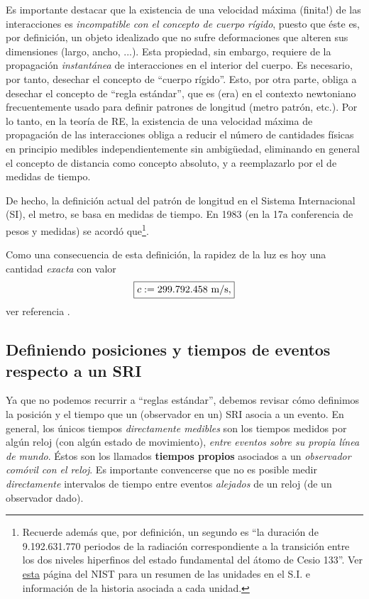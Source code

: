 Es importante destacar que la existencia de una velocidad máxima (finita!) de las interacciones es \textit{incompatible con el concepto de
cuerpo rígido}, puesto que éste es, por definición, un objeto idealizado
que no sufre deformaciones que alteren sus dimensiones (largo, ancho, ...).
Esta propiedad, sin embargo, requiere de la propagación \textit{instantánea} de interacciones en el interior del cuerpo. Es necesario, por tanto, desechar el concepto de ``cuerpo
rígido''. Esto, por otra parte, obliga a desechar el concepto de ``regla
estándar'', que es (era) en el contexto newtoniano frecuentemente usado para definir patrones de longitud (metro patrón, etc.). 
Por lo tanto, en la teoría de RE, la existencia de una velocidad máxima de propagación de las interacciones obliga a reducir el número de cantidades físicas en principio medibles independientemente sin ambig\"uedad, eliminando en general el concepto de distancia como concepto absoluto, y a reemplazarlo por el de medidas de tiempo.

De hecho, la definición actual del patrón de longitud en el Sistema
Internacional (SI), el metro, se basa en medidas de tiempo. En 1983 (en la 17a
conferencia de pesos y medidas) se acordó que\footnote{Recuerde además que, por definición, un segundo es ``la duración de 9.192.631.770 periodos de la radiación correspondiente a la transición entre los dos niveles hiperfinos del estado fundamental del átomo de Cesio 133''. Ver \href{http://physics.nist.gov/cuu/Units/current.html}{esta} página del NIST para un resumen de las unidades en el S.I. e información de la historia asociada a cada unidad.}.
\begin{quotation}
\end{quotation}
Como una consecuencia de esta definición, la rapidez de la luz es hoy una
cantidad \textit{exacta} con valor
\begin{equation}
\boxed{c:=299.792.458\rm\ m/s,}
\end{equation}
ver referencia \cite{CODATA00}.

\subsection{Definiendo posiciones y tiempos de eventos respecto a un SRI}

Ya que no podemos recurrir a ``reglas estándar'', debemos revisar cómo definimos la posición y el tiempo que un (observador en un) SRI asocia a un evento. En general, los únicos tiempos \textit{directamente medibles} son los tiempos medidos por algún reloj (con algún estado de movimiento), \textit{entre eventos sobre su propia línea de mundo}. Éstos son los llamados \textbf{tiempos propios} asociados a un \textit{observador comóvil con el reloj}. Es importante convencerse que no es posible medir \textit{directamente} intervalos de tiempo entre eventos \textit{alejados} de un reloj (de un observador dado).

